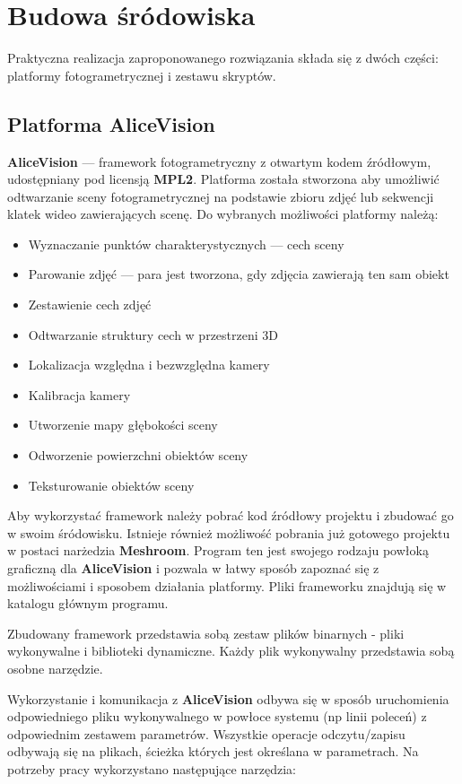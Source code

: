 \chapter{Budowa śródowiska}

Praktyczna realizacja zaproponowanego rozwiązania składa się z dwóch części: platformy fotogrametrycznej i zestawu skryptów.

\section{Platforma AliceVision}

\textbf{AliceVision} --- framework fotogrametryczny z otwartym kodem źródłowym, udostępniany pod licensją \textbf{MPL2}.
Platforma została stworzona aby umożliwić odtwarzanie sceny fotogrametrycznej na podstawie zbioru zdjęć lub sekwencji klatek wideo zawierających scenę.
Do wybranych możliwości platformy należą:
\begin{itemize}
   \item Wyznaczanie punktów charakterystycznych --- cech sceny
   \item Parowanie zdjęć --- para jest tworzona, gdy zdjęcia zawierają ten sam obiekt
   \item Zestawienie cech zdjęć
   \item Odtwarzanie struktury cech w przestrzeni 3D
   \item Lokalizacja względna i bezwzględna kamery
   \item Kalibracja kamery
   \item Utworzenie mapy głębokości sceny
   \item Odworzenie powierzchni obiektów sceny
   \item Teksturowanie obiektów sceny
\end{itemize}

Aby wykorzystać framework należy pobrać kod źródłowy projektu i zbudować go w swoim śródowisku.
Istnieje również możliwość pobrania już gotowego projektu w postaci narżedzia \textbf{Meshroom}. Program ten jest swojego rodzaju powłoką graficzną dla \textbf{AliceVision} i pozwala w łatwy sposób zapoznać się z możliwościami i sposobem działania platformy.
Pliki frameworku znajdują się w katalogu głównym programu.

Zbudowany framework przedstawia sobą zestaw plików binarnych - pliki wykonywalne i biblioteki dynamiczne.
Każdy plik wykonywalny przedstawia sobą osobne narzędzie.

Wykorzystanie i komunikacja z \textbf{AliceVision} odbywa się w sposób uruchomienia odpowiedniego pliku wykonywalnego w powłoce systemu (np linii poleceń) z odpowiednim zestawem parametrów.
Wszystkie operacje odczytu/zapisu odbywają się na plikach, ścieżka których jest określana w parametrach.
Na potrzeby pracy wykorzystano następujące narzędzia:

